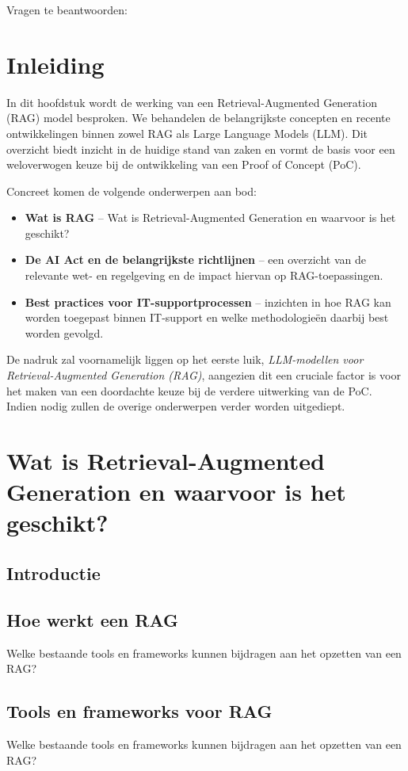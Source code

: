 Vragen te beantwoorden:

\section{Inleiding}
In dit hoofdstuk wordt de werking van een Retrieval-Augmented Generation (RAG) model besproken. We behandelen de belangrijkste concepten en recente ontwikkelingen binnen zowel RAG als Large Language Models (LLM). Dit overzicht biedt inzicht in de huidige stand van zaken en vormt de basis voor een weloverwogen keuze bij de ontwikkeling van een Proof of Concept (PoC).

Concreet komen de volgende onderwerpen aan bod:
\begin{itemize}
    \item \textbf{Wat is RAG} – Wat is Retrieval-Augmented Generation en waarvoor is het geschikt?
    \item \textbf{De AI Act en de belangrijkste richtlijnen} – een overzicht van de relevante wet- en regelgeving en de impact hiervan op RAG-toepassingen.
    \item \textbf{Best practices voor IT-supportprocessen} – inzichten in hoe RAG kan worden toegepast binnen IT-support en welke methodologieën daarbij best worden gevolgd.
\end{itemize}

De nadruk zal voornamelijk liggen op het eerste luik, \textit{LLM-modellen voor Retrieval-Augmented Generation (RAG)}, aangezien dit een cruciale factor is voor het maken van een doordachte keuze bij de verdere uitwerking van de PoC. Indien nodig zullen de overige onderwerpen verder worden uitgediept.

\section{Wat is Retrieval-Augmented Generation en waarvoor is het geschikt?}
 
    \subsection{Introductie}
    
    \subsection{Hoe werkt een RAG}
    Welke bestaande tools en frameworks kunnen bijdragen aan het opzetten van een RAG?
     
    \subsection{Tools en frameworks voor RAG}
    Welke bestaande tools en frameworks kunnen bijdragen aan het opzetten van een RAG?

